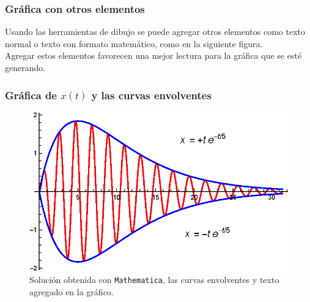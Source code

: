 \begin{frame}
\frametitle{Gráfica con otros elementos}
Usando las herramientas de dibujo se puede agregar otros elementos como texto normal o texto con formato matemático, como en la siguiente figura.
\\
\bigskip
\pause
Agregar estos elementos favorecen una mejor lectura para la gráfica que se esté generando.
\end{frame}
\begin{frame}
\frametitle{Gráfica de $x(t)$ y las curvas envolventes}
\begin{figure}[H]
    \centering
    \includegraphics[scale=1]{Imagenes/Ejemplo_Resonancia_05.eps}
    \caption{Solución obtenida con \texttt{Mathematica}, las curvas envolventes y texto agregado en la gráfico.}
\end{figure}
\end{frame}
